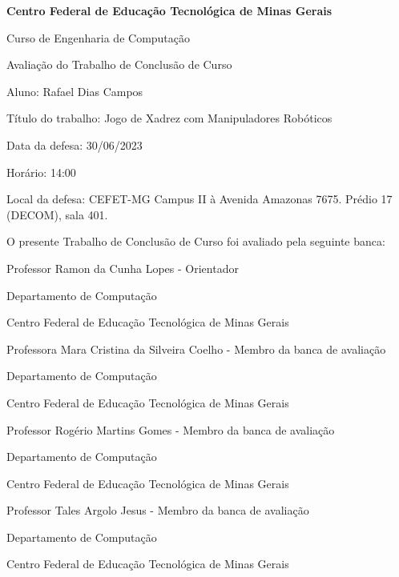 %
\begin{folhadeaprovacao}

  \begin{center}
    \textbf{Centro Federal de Educação Tecnológica de Minas Gerais}

    Curso de Engenharia de Computação

    Avaliação do Trabalho de Conclusão de Curso
  \end{center}

  \vspace{1cm}

  \noindent
  Aluno: Rafael Dias Campos

  \noindent
  Título do trabalho: Jogo de Xadrez com Manipuladores Robóticos

  \noindent
  Data da defesa: 30/06/2023

  \noindent
  Horário: 14:00

  \noindent
  Local da defesa: CEFET-MG Campus II à Avenida Amazonas 7675. Prédio 17 (DECOM), sala 401. 

  \vspace{1cm}

  \begin{center}
    O presente Trabalho de Conclusão de Curso foi avaliado pela seguinte banca:

    \vspace{1cm}

    Professor Ramon da Cunha Lopes - Orientador

    Departamento de Computação

    Centro Federal de Educação Tecnológica de Minas Gerais

    \vspace{1cm}

    Professora Mara Cristina da Silveira Coelho - Membro da banca de avaliação

    Departamento de Computação

    Centro Federal de Educação Tecnológica de Minas Gerais

    \vspace{1cm}

    Professor Rogério Martins Gomes - Membro da banca de avaliação

    Departamento de Computação

    Centro Federal de Educação Tecnológica de Minas Gerais   

    \vspace{1cm}

    Professor Tales Argolo Jesus - Membro da banca de avaliação

    Departamento de Computação

    Centro Federal de Educação Tecnológica de Minas Gerais
 
  \end{center}
  
\end{folhadeaprovacao}

